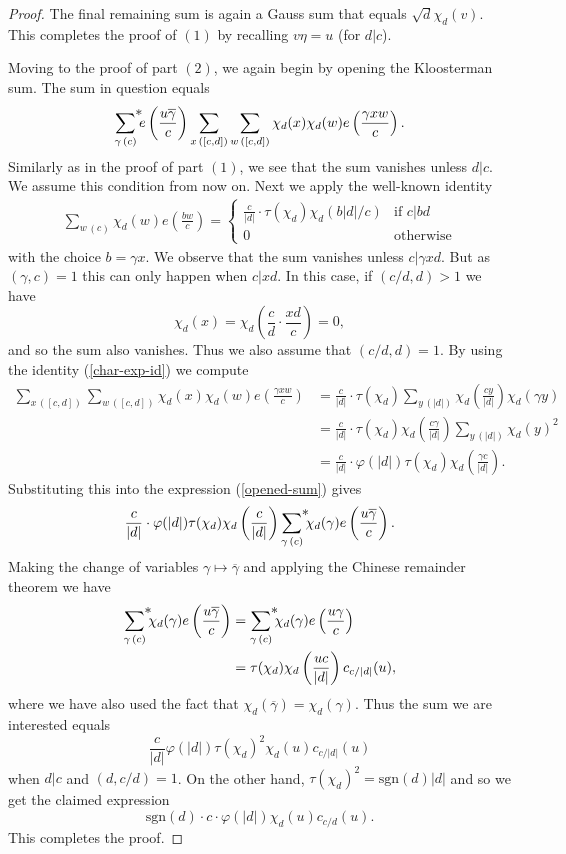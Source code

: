 \documentclass[a4paper,10pt,twoside]{amsart}
\theoremstyle{definition}
\numberwithin{equation}{section}
\renewcommand\:{\colon}
\begin{document}
\begin{proof}
The final remaining sum is again a Gauss sum that equals $\sqrt d\chi_d(v)$. This completes the proof of $(1)$ by recalling $v\eta=u$ (for $d|c$). 

Moving to the proof of part $(2)$, we again begin by opening the Kloosterman sum. The sum in question equals
\begin{align}\label{opened-sum}
\mathop{{\sum}^{\makebox[0pt][l]{$*$}}}_{\gamma\,(c)}e\left(\frac{u\overline\gamma}c\right)\sum_{x\,([c,d])}\sum_{w\,([c,d])}\chi_d(x)\chi_d(w)e\left(\frac{\gamma xw}c\right).
\end{align}
Similarly as in the proof of part $(1)$, we see that the sum vanishes unless $d|c$. We assume this condition from now on. Next we apply the well-known identity
\begin{align}\label{char-exp-id}
\sum_{w\,(c)}\chi_d(w)e\left(\frac{bw}c\right)=\begin{cases}
\frac c{|d|}\cdot\tau(\chi_d)\chi_d(b|d|/c) & \text{if }c|bd \\
0 & \text{otherwise}
\end{cases}
\end{align}
with the choice $b=\gamma x$. We observe that the sum vanishes unless $c|\gamma xd$. But as $(\gamma,c)=1$ this can only happen when $c|xd$. In this case, if $(c/d,d)>1$ we have 
\[
\chi_d(x)=\chi_d\left(\frac cd \cdot \frac{xd}c\right)=0,
\]
and so the sum also vanishes. Thus we also assume that $(c/d,d)=1$. By using the identity (\ref{char-exp-id}) we compute
\begin{align*}
\sum_{x\,([c,d])}\sum_{w\,([c,d])}\chi_d(x)\chi_d(w)e\left(\frac{\gamma xw}c\right)&=\frac c{|d|}\cdot\tau(\chi_d)\sum_{y\,(|d|)}\chi_d\left(\frac{cy}{|d|}\right)\chi_d(\gamma y)\\
&=\frac c{|d|}\cdot\tau(\chi_d)\chi_d\left(\frac{c\gamma}{|d|}\right)\sum_{y\,(|d|)}\chi_d(y)^2\\
&=\frac c{|d|}\cdot\varphi(|d|)\tau(\chi_d)\chi_d\left(\frac{\gamma c}{|d|}\right).
\end{align*}
Substituting this into the expression (\ref{opened-sum}) gives
\[
\frac c{|d|}\cdot\varphi(|d|)\tau(\chi_d)\chi_d\left(\frac c{|d|}\right)\mathop{{\sum}^{\makebox[0pt][l]{$*$}}}_{\gamma\,(c)}\chi_d(\gamma)e\left(\frac{u\overline\gamma}c\right).
\] 
Making the change of variables $\gamma\mapsto\overline\gamma$ and applying the Chinese remainder theorem we have
\begin{align*}
\mathop{{\sum}^{\makebox[0pt][l]{$*$}}}_{\gamma\,(c)}\chi_d(\gamma)e\left(\frac{u\overline\gamma}c\right)&=\mathop{{\sum}^{\makebox[0pt][l]{$*$}}}_{\gamma\,(c)}\chi_d(\gamma)e\left(\frac{u\gamma}c\right)\\
&=\tau(\chi_d)\chi_d\left(\frac{uc}{|d|}\right)c_{c/|d|}(u),
\end{align*}
where we have also used the fact that $\chi_d(\overline\gamma)=\chi_d(\gamma)$. Thus the sum we are interested equals
\[
\frac c{|d|}\varphi(|d|)\tau(\chi_d)^2\chi_d(u)c_{c/|d|}(u)
\]
when $d|c$ and $(d,c/d)=1$. On the other hand, $\tau(\chi_d)^2=\text{sgn}(d)|d|$ and so we get the claimed expression
\[
\text{sgn}(d)\cdot c\cdot\varphi(|d|)\chi_d(u)c_{c/d}(u).
\]
This completes the proof. 
\end{proof}
\end{document}
